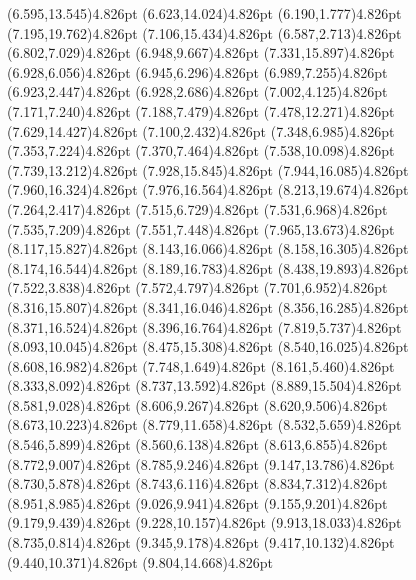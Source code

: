 \documentclass[10pt]{article}
\begin{document}
{{\qdisk(6.595,13.545){4.826pt}%
\qdisk(6.623,14.024){4.826pt}%
\qdisk(6.190,1.777){4.826pt}%
\qdisk(7.195,19.762){4.826pt}%
\qdisk(7.106,15.434){4.826pt}%
\qdisk(6.587,2.713){4.826pt}%
\qdisk(6.802,7.029){4.826pt}%
\qdisk(6.948,9.667){4.826pt}%
\qdisk(7.331,15.897){4.826pt}%
\qdisk(6.928,6.056){4.826pt}%
\qdisk(6.945,6.296){4.826pt}%
\qdisk(6.989,7.255){4.826pt}%
\qdisk(6.923,2.447){4.826pt}%
\qdisk(6.928,2.686){4.826pt}%
\qdisk(7.002,4.125){4.826pt}%
\qdisk(7.171,7.240){4.826pt}%
\qdisk(7.188,7.479){4.826pt}%
\qdisk(7.478,12.271){4.826pt}%
\qdisk(7.629,14.427){4.826pt}%
\qdisk(7.100,2.432){4.826pt}%
\qdisk(7.348,6.985){4.826pt}%
\qdisk(7.353,7.224){4.826pt}%
\qdisk(7.370,7.464){4.826pt}%
\qdisk(7.538,10.098){4.826pt}%
\qdisk(7.739,13.212){4.826pt}%
\qdisk(7.928,15.845){4.826pt}%
\qdisk(7.944,16.085){4.826pt}%
\qdisk(7.960,16.324){4.826pt}%
\qdisk(7.976,16.564){4.826pt}%
\qdisk(8.213,19.674){4.826pt}%
\qdisk(7.264,2.417){4.826pt}%
\qdisk(7.515,6.729){4.826pt}%
\qdisk(7.531,6.968){4.826pt}%
\qdisk(7.535,7.209){4.826pt}%
\qdisk(7.551,7.448){4.826pt}%
\qdisk(7.965,13.673){4.826pt}%
\qdisk(8.117,15.827){4.826pt}%
\qdisk(8.143,16.066){4.826pt}%
\qdisk(8.158,16.305){4.826pt}%
\qdisk(8.174,16.544){4.826pt}%
\qdisk(8.189,16.783){4.826pt}%
\qdisk(8.438,19.893){4.826pt}%
\qdisk(7.522,3.838){4.826pt}%
\qdisk(7.572,4.797){4.826pt}%
\qdisk(7.701,6.952){4.826pt}%
\qdisk(8.316,15.807){4.826pt}%
\qdisk(8.341,16.046){4.826pt}%
\qdisk(8.356,16.285){4.826pt}%
\qdisk(8.371,16.524){4.826pt}%
\qdisk(8.396,16.764){4.826pt}%
\qdisk(7.819,5.737){4.826pt}%
\qdisk(8.093,10.045){4.826pt}%
\qdisk(8.475,15.308){4.826pt}%
\qdisk(8.540,16.025){4.826pt}%
\qdisk(8.608,16.982){4.826pt}%
\qdisk(7.748,1.649){4.826pt}%
\qdisk(8.161,5.460){4.826pt}%
\qdisk(8.333,8.092){4.826pt}%
\qdisk(8.737,13.592){4.826pt}%
\qdisk(8.889,15.504){4.826pt}%
\qdisk(8.581,9.028){4.826pt}%
\qdisk(8.606,9.267){4.826pt}%
\qdisk(8.620,9.506){4.826pt}%
\qdisk(8.673,10.223){4.826pt}%
\qdisk(8.779,11.658){4.826pt}%
\qdisk(8.532,5.659){4.826pt}%
\qdisk(8.546,5.899){4.826pt}%
\qdisk(8.560,6.138){4.826pt}%
\qdisk(8.613,6.855){4.826pt}%
\qdisk(8.772,9.007){4.826pt}%
\qdisk(8.785,9.246){4.826pt}%
\qdisk(9.147,13.786){4.826pt}%
\qdisk(8.730,5.878){4.826pt}%
\qdisk(8.743,6.116){4.826pt}%
\qdisk(8.834,7.312){4.826pt}%
\qdisk(8.951,8.985){4.826pt}%
\qdisk(9.026,9.941){4.826pt}%
\qdisk(9.155,9.201){4.826pt}%
\qdisk(9.179,9.439){4.826pt}%
\qdisk(9.228,10.157){4.826pt}%
\qdisk(9.913,18.033){4.826pt}%
\qdisk(8.735,0.814){4.826pt}%
\qdisk(9.345,9.178){4.826pt}%
\qdisk(9.417,10.132){4.826pt}%
\qdisk(9.440,10.371){4.826pt}%
\qdisk(9.804,14.668){4.826pt}%
}}
\end{document}
